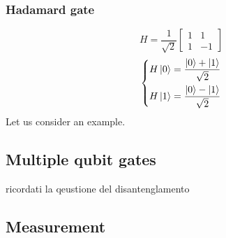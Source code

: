 \subsubsection{Hadamard gate}

\begin{equation}
    H = \frac{1}{\sqrt{2}}
    \begin{bmatrix}
    1 & 1\\
    1 & -1
    \end{bmatrix}
\end{equation}
\begin{equation}
\left\{
\begin{aligned}
    & H\ket{0} = \frac{\ket{0} + \ket{1}}{\sqrt{2}} \\
    & H\ket{1} = \frac{\ket{0} - \ket{1}}{\sqrt{2}}
\end{aligned}
\right.
\end{equation}
Let us consider an example.

\subsection{Multiple qubit gates}
ricordati la qeustione del disantenglamento
\subsection{Measurement}\label{sec:measurement}